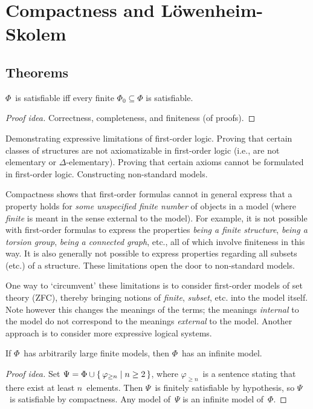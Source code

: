 %
%
%
\section{Compactness and L\"owenheim-Skolem}
\subsection*{Theorems}
\begin{thm}[Compactness]
\(\Phi\)~is satisfiable iff every finite \(\Phi_0\subseteq\Phi\) is satisfiable.
\end{thm}
\begin{proof}[Proof idea]
Correctness, completeness, and finiteness (of proofs).
\end{proof}
\begin{app}
Demonstrating expressive limitations of first-order logic. Proving that certain classes of structures are not axiomatizable in first-order logic (i.e., are not elementary or \(\Delta\)-elementary). Proving that certain axioms cannot be formulated in first-order logic. Constructing non-standard models.
\end{app}
\begin{rmk}
Compactness shows that first-order formulas cannot in general express that a property holds for \emph{some unspecified finite number} of objects in a model (where \emph{finite} is meant in the sense external to the model). For example, it is not possible with first-order formulas to express the properties \emph{being a finite structure}, \emph{being a torsion group}, \emph{being a connected graph}, etc., all of which involve finiteness in this way. It is also generally not possible to express properties regarding all subsets (etc.) of a structure. These limitations open the door to non-standard models.

One way to `circumvent' these limitations is to consider first-order models of set theory (ZFC), thereby bringing notions of \emph{finite}, \emph{subset}, etc. into the model itself. Note however this changes the meanings of the terms; the meanings \emph{internal} to the model do not correspond to the meanings \emph{external} to the model. Another approach is to consider more expressive logical systems.
\end{rmk}

\begin{cor}
If \(\Phi\)~has arbitrarily large finite models, then \(\Phi\)~has an infinite model.
\end{cor}
\begin{proof}[Proof idea]
Set \(\Psi=\Phi\cup\{\,\varphi_{\ge n}\mid n\ge 2\,\}\), where \(\varphi_{\ge n}\)~is a sentence stating that there exist at least \(n\)~elements. Then \(\Psi\)~is finitely satisfiable by hypothesis, so \(\Psi\)~is satisfiable by compactness. Any model of~\(\Psi\) is an infinite model of~\(\Phi\).
\end{proof}

